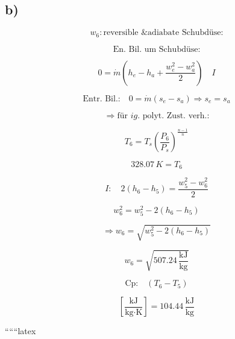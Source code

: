 

\subsection*{b)}

\[
w_6: \text{reversible \& adiabate Schubdüse:}
\]

\[
\text{En. Bil. um Schubdüse:}
\]

\[
0 = \dot{m} (h_e - h_a + \frac{w_e^2 - w_a^2}{2}) \quad I
\]

\[
\text{Entr. Bil.:} \quad 0 = \dot{m} (s_e - s_a) \Rightarrow s_e = s_a
\]

\[
\Rightarrow \text{für } ig. \text{ polyt. Zust. verh.:}
\]

\[
T_6 = T_s \left( \frac{P_6}{P_s} \right)^{\frac{n-1}{n}}
\]

\[
328.07 \, K = T_6
\]

\[
I: \quad 2 \left( h_6 - h_5 \right) = \frac{w_5^2 - w_6^2}{2}
\]

\[
w_6^2 = w_5^2 - 2 \left( h_6 - h_5 \right)
\]

\[
\Rightarrow w_6 = \sqrt{w_5^2 - 2 \left( h_6 - h_5 \right)}
\]

\[
w_6 = \sqrt{507.24 \, \frac{\text{kJ}}{\text{kg}}}
\]

\[
\text{Cp:} \quad (T_6 - T_5)
\]

\[
\left[ \frac{\text{kJ}}{\text{kg} \cdot \text{K}} \right] = 104.44 \, \frac{\text{kJ}}{\text{kg}}
\]

``````latex